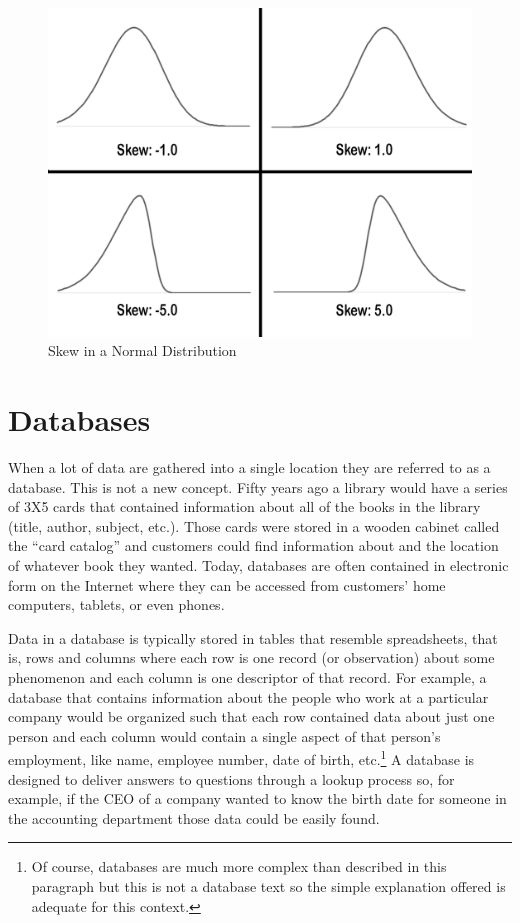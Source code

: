 \begin{figure}[H]
	\centering
	\includegraphics[width=\maxwidth{.95\linewidth}]{gfx/06-Skew}
	\caption{Skew in a Normal Distribution}
	\label{fig06.03}
\end{figure}

\section{Databases}

When a lot of data are gathered into a single location they are referred to as a \gls{database}. This is not a new concept. Fifty years ago a library would have a series of 3X5 cards that contained information about all of the books in the library (title, author, subject, etc.). Those cards were stored in a wooden cabinet called the ``card catalog'' and customers could find information about and the location of whatever book they wanted. Today, databases are often contained in electronic form on the Internet where they can be accessed from customers' home computers, tablets, or even phones.

Data in a database is typically stored in tables that resemble spreadsheets, that is, rows and columns where each row is one record (or observation) about some phenomenon and each column is one descriptor of that record. For example, a database that contains information about the people who work at a particular company would be organized such that each row contained data about just one person and each column would contain a single aspect of that person's employment, like name, employee number, date of birth, etc.\footnote{Of course, databases are much more complex than described in this paragraph but this is not a database text so the simple explanation offered is adequate for this context.} A database is designed to deliver answers to questions through a lookup process so, for example, if the CEO of a company wanted to know the birth date for someone in the accounting department those data could be easily found. 

